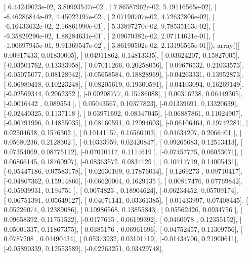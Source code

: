 \documentclass{article}
\begin{document}
       [  6.44249023e-02,   3.80993547e-02],
       [  7.86587962e-02,   5.19116565e-02],
       [ -6.46286844e-02,   4.45022197e-02],
       [  2.07190707e-02,   4.72632806e-02],
       [ -6.16433632e-02,   2.16861990e-01],
       [  5.33897270e-02,   9.78535163e-02],
       [ -9.35829290e-02,   1.88284631e-01],
       [  2.09670382e-02,   2.07114621e-01],
       [ -1.00697945e-01,   9.91369547e-02],
       [  3.86190502e-02,   2.13196565e-01]]), array([[ 0.00917433,  0.01830005],
       [-0.04911862,  0.14813335],
       [ 0.03624207,  0.15827005],
       [-0.03501762,  0.13333958],
       [ 0.07011266,  0.20258056],
       [ 0.09676532,  0.21033573],
       [-0.05075077,  0.08128942],
       [-0.05658584,  0.18828969],
       [-0.04263331,  0.13952873],
       [-0.06980418,  0.10223248],
       [ 0.08205619,  0.19300591],
       [-0.04103094,  0.16269149],
       [-0.02569344,  0.2062352 ],
       [-0.00208777,  0.15786088],
       [ 0.00316238,  0.06449305],
       [-0.0016442 ,  0.089554  ],
       [ 0.05043567,  0.10377823],
       [-0.01339691,  0.13320639],
       [-0.02440325,  0.1137118 ],
       [ 0.03971692,  0.08347045],
       [-0.06887861,  0.11024907],
       [-0.06791996,  0.14855035],
       [ 0.08160591,  0.12094603],
       [-0.06106464,  0.19742281],
       [ 0.02504638,  0.1576302 ],
       [ 0.10141157,  0.16560103],
       [ 0.04634207,  0.2066401 ],
       [ 0.05680236,  0.2128302 ],
       [ 0.10333959,  0.02420847],
       [ 0.09265683,  0.12513413],
       [ 0.07354069,  0.08775112],
       [-0.07010117,  0.1114619 ],
       [-0.07457775,  0.06053071],
       [ 0.06866145,  0.18760907],
       [-0.08363572,  0.0834129 ],
       [ 0.10717719,  0.14005431],
       [-0.05447186,  0.07583178],
       [ 0.02630109,  0.17876034],
       [ 0.1269273 ,  0.09710417],
       [-0.04867362,  0.15914866],
       [-0.06620004,  0.1629135 ],
       [ 0.00817476,  0.07769842],
       [-0.05939931,  0.194751  ],
       [ 0.0074823 ,  0.18904624],
       [-0.06234452,  0.05709174],
       [-0.06751391,  0.05649127],
       [ 0.04071141,  0.03361385],
       [ 0.01433997,  0.07408445],
       [ 0.05226074,  0.12389086],
       [ 0.10986568,  0.13855843],
       [ 0.05562426,  0.0934756 ],
       [ 0.09658392,  0.11751522],
       [-0.0177615 ,  0.06199392],
       [ 0.0460978 ,  0.12355152],
       [ 0.05001337,  0.11867375],
       [ 0.0385176 ,  0.06961696],
       [-0.04752457,  0.11309756],
       [ 0.0787208 ,  0.04490434],
       [ 0.05373932,  0.03101719],
       [-0.01434706,  0.21900611],
       [-0.05890339,  0.12553589],
       [-0.02263251,  0.03429748],
\end{document}
